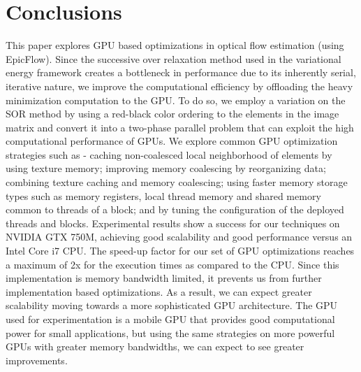 \documentclass[english]{article}
\begin{document}
	\section{Conclusions}
	This paper explores GPU based optimizations in optical flow estimation (using EpicFlow). Since the successive over relaxation method used in the variational energy framework creates a bottleneck in performance due to its inherently serial, iterative nature, we improve the computational efficiency by offloading the heavy minimization computation to the GPU. To do so, we employ a variation on the SOR method by using a red-black color ordering to the elements in the image matrix and convert it into a two-phase parallel problem that can exploit the high computational performance of GPUs. We explore common GPU optimization strategies such as - caching non-coalesced local neighborhood of elements by using texture memory; improving memory coalescing by reorganizing data; combining texture caching and memory coalescing; using faster memory storage types such as memory registers, local thread memory and shared memory common to threads of a block; and by tuning the configuration of the deployed threads and blocks. Experimental results show a success for our techniques on NVIDIA GTX 750M, achieving good scalability and good performance versus an Intel Core i7 CPU. The speed-up factor for our set of GPU optimizations reaches a maximum of 2x for the execution times as compared to the CPU. Since this implementation is memory bandwidth limited, it prevents us from further implementation based optimizations. As a result, we can expect greater scalability moving towards a more sophisticated GPU architecture. The GPU used for experimentation is a mobile GPU that provides good computational power for small applications, but using the same strategies on more powerful GPUs with greater memory bandwidths, we can expect to see greater improvements.

		
	

	
\end{document}
